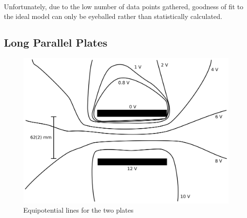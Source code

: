 \documentclass[a4paper]{scrartcl}
\begin{document}
Unfortunately, due to the low number of data points gathered, goodness of fit to the ideal model can only be eyeballed rather than statistically calculated.

\subsection{Long Parallel Plates}
\begin{figure}
    \centering
    \includegraphics[width = 15cm]{lab2_parallel_plates.png}
    \caption{Equipotential lines for the two plates}
    \label{fig:parallel_plates}
\end{figure}
\end{document}
